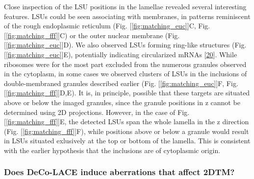 \documentclass[
]{article}
\begin{document}
Close inspection of the LSU positions in the lamellae revealed several
interesting features. LSUs could be seen associating with membranes, in
patterns reminiscent of the rough endoplasmic reticulum (Fig.
{[}\ref{fig:matching_euc}{]}C, Fig. {[}\ref{fig:matching_fff}{]}C) or the outer nuclear
membrane (Fig. {[}\ref{fig:matching_euc}{]}D). We also observed LSUs forming
ring-like structures (Fig. {[}\ref{fig:matching_euc}{]}E), potentially indicating
circularized mRNAs {[}\protect\hyperlink{ref-cie13Q8F}{20}{]}. While ribosomes were for the most part excluded
from the numerous granules observed in the cytoplasm, in some cases we observed
clusters of LSUs in the inclusions of double-membraned granules
described earlier (Fig. {[}\ref{fig:matching_euc}{]}F, Fig. {[}\ref{fig:matching_fff}{]}D,E). It is, in principle, possible that these targets are situated above or
below the imaged granules, since the granule positions in z cannot be determined
using 2D projections. However, in the case of Fig. {[}\ref{fig:matching_fff}{]}E, the
detected LSUs span the whole lamella in the z direction (Fig. {[}\ref{fig:matching_fff}{]}F), while positions
above or below a granule would result in LSUs situated exlusively at the
top or bottom of the lamella. This is consistent with the earlier hypothesis that the inclusions are of
cytoplasmic origin.

\hypertarget{does-deco-lace-induce-aberrations-that-affect-2dtm}{%
\subsubsection{Does DeCo-LACE induce aberrations that affect 2DTM?}\label{does-deco-lace-induce-aberrations-that-affect-2dtm}}
\end{document}
